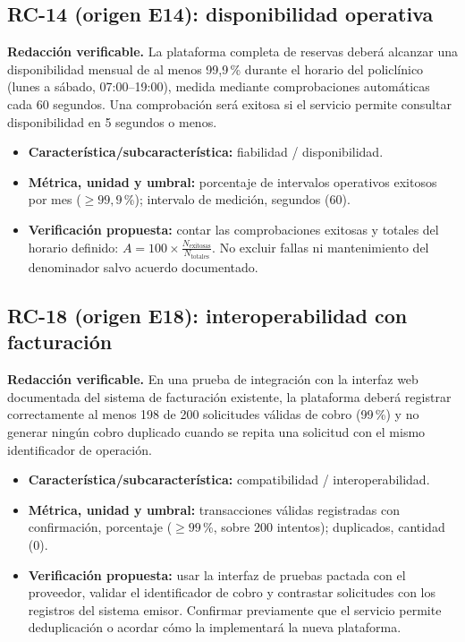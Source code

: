 \documentclass[11pt,a4paper]{article}
\begin{document}
\subsection*{RC-14 (origen E14): disponibilidad operativa}
\textbf{Redacción verificable.} La plataforma completa de reservas deberá alcanzar una disponibilidad mensual de al menos 99,9\,\% durante el horario del policlínico (lunes a sábado, 07:00--19:00), medida mediante comprobaciones automáticas cada 60 segundos. Una comprobación será exitosa si el servicio permite consultar disponibilidad en 5 segundos o menos.
\begin{itemize}
\item \textbf{Característica/subcaracterística:} fiabilidad / disponibilidad.
\item \textbf{Métrica, unidad y umbral:} porcentaje de intervalos operativos exitosos por mes (\(\geq99{,}9\)\,\%); intervalo de medición, segundos (60).
\item \textbf{Verificación propuesta:} contar las comprobaciones exitosas y totales del horario definido: \(A=100\times\tfrac{N_{\mathrm{exitosas}}}{N_{\mathrm{totales}}}\). No excluir fallas ni mantenimiento del denominador salvo acuerdo documentado.
\end{itemize}

\subsection*{RC-18 (origen E18): interoperabilidad con facturación}
\textbf{Redacción verificable.} En una prueba de integración con la interfaz web documentada del sistema de facturación existente, la plataforma deberá registrar correctamente al menos 198 de 200 solicitudes válidas de cobro (99\,\%) y no generar ningún cobro duplicado cuando se repita una solicitud con el mismo identificador de operación.
\begin{itemize}
\item \textbf{Característica/subcaracterística:} compatibilidad / interoperabilidad.
\item \textbf{Métrica, unidad y umbral:} transacciones válidas registradas con confirmación, porcentaje (\(\geq99\)\,\%, sobre 200 intentos); duplicados, cantidad (0).
\item \textbf{Verificación propuesta:} usar la interfaz de pruebas pactada con el proveedor, validar el identificador de cobro y contrastar solicitudes con los registros del sistema emisor. Confirmar previamente que el servicio permite deduplicación o acordar cómo la implementará la nueva plataforma.
\end{itemize}
\end{document}

